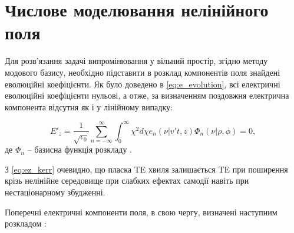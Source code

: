 

\section{Числове моделювання нелінійного поля}

Для розв'язання задачі випромінювання у вільний простір, згідно методу 
модового базису, необхідно підставити в розклад компонентів поля знайдені 
еволюційні коефіцієнти. Як було доведено в \eqref{eq:e_evolution}, всі електричні 
еволюційні коефіцієнти нульові, а отже, за визначенням поздовжня електрична
компонента відсутня як і у лінійному випадку:

\begin{equation} \label{eq:ez_kerr}
E'_z = \frac{1}{\sqrt{\epsilon_0}} \sum_{n=-\infty}^{\infty}
\int_0^\infty \chi^2 d \chi e_n (\nu | v't, z) \Phi_n (\nu | \rho, \phi) = 0,
\end{equation}
%
де $ \Phi_n $ -- базисна функція розкладу \cite{imp:Tretyakov2010}.

З \eqref{eq:ez_kerr} очевидно, що пласка TE хвиля залишається TE при поширення 
крізь нелінійне середовище при слабких ефектах самодії навіть при 
нестаціонарному збудженні.

Поперечні електричні компоненти поля, в свою чергу, визначені наступним 
розкладом \cite{imp:Dumin2000}:

